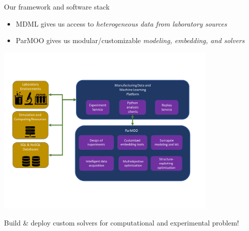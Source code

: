 \documentclass[a0paper,landscape]{baposter}
\begin{document}
\begin{poster}
{}

\begin{posterbox}[name=framework,column=1,row=0]{Our framework and software stack}
  \setlength{\parskip}{0.5\baselineskip}

  \smallskip

  {\small
  \begin{itemize}
  \item MDML gives us access to {\sl heterogeneous data from laboratory sources}
  \item ParMOO gives us modular/customizable {\sl modeling, embedding, and solvers}
  \end{itemize}}
  \begin{center}

  \vskip -25pt

  \includegraphics[width=0.8\textwidth]{../img/moo_new/mdml-parmoo-2.pdf}

  \vskip -25pt

  {\small
  Build \& deploy custom solvers for computational and experimental problem!

  }
  \end{center}
\end{posterbox}

\end{poster}
\end{document}
